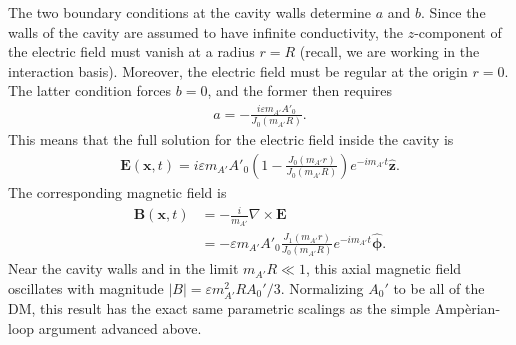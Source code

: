 \documentclass[amsmath,amssymb,aps,10pt,prd,letterpaper,nofootinbib,balancelastpage,notitlepage,superscriptaddress,twocolumn,floatfix]{revtex4-2}
\newcommand{\phihat}{\bm{\hat{\phi}}}
\newcommand{\zhat}{\bm{\hat{z}}}
\begin{document}
The two boundary conditions at the cavity walls determine $a$ and $b$.
Since the walls of the cavity are assumed to have infinite conductivity, the $z$-component of the electric field must vanish at a radius $r=R$ (recall, we are working in the interaction basis).
Moreover, the electric field must be regular at the origin $r=0$.  The latter condition forces $b=0$, and the former then requires
\begin{align}
    a=-\frac{i\varepsilon m_{A'}A'_0}{J_0(m_{A'}R)}.
\end{align}
This means that the full solution for the electric field inside the cavity is~\cite{Chaudhuri:2014dla}
\begin{align}
    \bm{E}(\bm{x},t)=i\varepsilon m_{A'}A'_0\left(1-\frac{J_0(m_{A'}r)}{J_0(m_{A'}R)}\right)e^{-im_{A'}t}\zhat.
    \label{eq:elec_cyl}
\end{align}
The corresponding magnetic field is~\cite{Chaudhuri:2014dla}
\begin{align}
    \bm{B}(\bm{x},t)&=-\frac i{m_{A'}}\nabla\times\bm{E} \label{eq:BfromE}
    \\&=-\varepsilon m_{A'}A'_0\frac{J_1(m_{A'}r)}{J_0(m_{A'}R)}e^{-im_{A'}t}\phihat.
    \label{eq:mag_cyl}
\end{align}
Near the cavity walls and in the limit $m_{A'}R\ll 1$, this axial magnetic field oscillates with magnitude $|B|=\varepsilon m_{A'}^2 R A_0' / 3$.
Normalizing $A_0'$ to be all of the DM, this result has the exact same parametric scalings as the simple Amp\`erian-loop argument advanced above.
\end{document}
